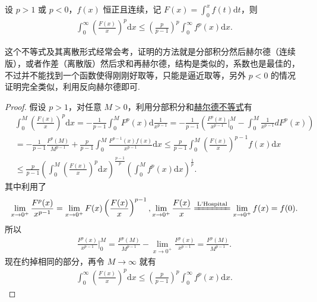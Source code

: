 \documentclass[../../main.tex]{subfiles}
\begin{document}
\begin{theorem}[Hardy不等式]\label{theorem:Hardy(哈代)不等式}
设 $p > 1$ 或 $p < 0$，$f(x)$ 恒正且连续，记 $F(x) = \int_0^x f(t) \mathrm{d}t$，则
\begin{align*}
\int_0^\infty \left( \frac{F(x)}{x} \right)^p \mathrm{d}x \leqslant \left( \frac{p}{p - 1} \right)^p \int_0^\infty f^p(x) \mathrm{d}x.
\end{align*}
\end{theorem}
\begin{remark}
这个不等式及其离散形式经常会考，证明的方法就是分部积分然后赫尔德（连续版），或者作差（离散版）然后求和再赫尔德，结构是类似的，系数也是最佳的，不过并不能找到一个函数使得刚刚好取等，只能是逼近取等，另外 $p < 0$ 的情况证明完全类似，利用反向赫尔德即可.
\end{remark}
\begin{proof}
假设 $p > 1$，对任意 $M > 0$，利用分部积分和\hyperref[theorem:Hold(赫尔德)不等式(积分形式)]{赫尔德不等式}有
\begin{align*}
&\int_0^M \left( \frac{F(x)}{x} \right)^p \mathrm{d}x = -\frac{1}{p - 1} \int_0^M F^p(x) \mathrm{d}\frac{1}{x^{p - 1}} = -\frac{1}{p - 1} \left( \frac{F^p(x)}{x^{p - 1}} \bigg|_0^M - \int_0^M \frac{1}{x^{p - 1}} dF^p(x) \right)
\\
&= -\frac{1}{p - 1} \frac{F^p(M)}{M^{p - 1}} + \frac{p}{p - 1} \int_0^M \frac{F^{p - 1}(x) f(x)}{x^{p - 1}} \mathrm{d}x \leqslant \frac{p}{p - 1} \int_0^M \left( \frac{F(x)}{x} \right)^{p - 1} f(x) \mathrm{d}x
\\
&\leqslant \frac{p}{p - 1} \left( \int_0^M \left( \frac{F(x)}{x} \right)^p \mathrm{d}x \right)^{\frac{p - 1}{p}} \left( \int_0^M f^p(x) \mathrm{d}x \right)^{\frac{1}{p}}.
\end{align*}
其中利用了
\begin{align*}
\lim_{x \to 0^+} \frac{F^p(x)}{x^{p - 1}} = \lim_{x \to 0^+} F(x) \left( \frac{F(x)}{x} \right)^{p - 1}, \lim_{x \to 0^+} \frac{F(x)}{x} \xlongequal{\text{L'Hospital}} \lim_{x \to 0^+} f(x) = f(0).
\end{align*}
所以
\begin{align*}
\frac{F^p(x)}{x^{p - 1}} \bigg|_0^M = \frac{F^p(M)}{M^{p - 1}} - \lim_{x \to 0^+} \frac{F^p(x)}{x^{p - 1}} = \frac{F^p(M)}{M^{p - 1}}.
\end{align*}
现在约掉相同的部分，再令 $M \to \infty$ 就有
\begin{align*}
\int_0^\infty \left( \frac{F(x)}{x} \right)^p \mathrm{d}x \leqslant \left( \frac{p}{p - 1} \right)^p \int_0^\infty f^p(x) \mathrm{d}x.
\end{align*}

\end{proof}
\end{document}
